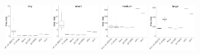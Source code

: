 \documentclass[../document.tex]{subfiles}
\begin{document}
\label{ssec:time}

\captionsetup[subfigure]{justification=raggedright,singlelinecheck=false}

\begin{figure}
	\begin{subfigure}{0.09\textwidth} \label{fig:time-kmeans} \vspace{5mm}\end{subfigure}
	\begin{subfigure}{0.9\textwidth}
		\includegraphics[width=0.22\textwidth]{figures/time-results/generate_kmeans_no_knl_tiny_boxplot-1}
		\includegraphics[width=0.22\textwidth]{figures/time-results/generate_kmeans_no_knl_small_boxplot-1}
		\includegraphics[width=0.22\textwidth]{figures/time-results/generate_kmeans_no_knl_medium_boxplot-1}
		\includegraphics[width=0.22\textwidth]{figures/time-results/generate_kmeans_no_knl_large_boxplot-1}
	\end{subfigure}


\end{figure}
\end{document}
